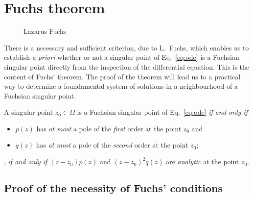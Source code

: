 
\section{Fuchs theorem}

\begin{figure}
   \caption{Lazarus Fuchs}
\end{figure}

There is a necessary and sufficient criterion, due to L.~Fuchs, which enables us to establish  \emph{a priori} whether or not a singular point of
Eq.~\eqref{eq:ode} is a Fuchsian singular point directly from the inspection  of
the differential equation. This is the content of Fuchs' theorem. The proof of
the theorem will lead us to a practical way to determine a foundamental system
of solutions in a neighbourhood of a Fuchsian singular point.

\begin{theorem}
   A %
   singular point 
   $z_{0}\in \Omega$ is a Fuchsian singular point of Eq.~\eqref{eq:ode} \emph{if
      and only if} 
   \begin{itemize}
      \item $p(z)$ has \emph{at most} a pole of the \emph{first} order at the point
	 $z_{0}$ and
      \item $q(z)$ has \emph{at most} a pole of the \emph{second} order at the point
	 $z_{0}$;
   \end{itemize}
   \ie, \emph{if and only if}
   $(z-z_{0}) p(z)$ and $(z-z_{0})^{2} q(z)$ are \emph{analytic} at the point
   $z_{0}$.
\end{theorem}


\subsection{Proof of the necessity of Fuchs' conditions}


